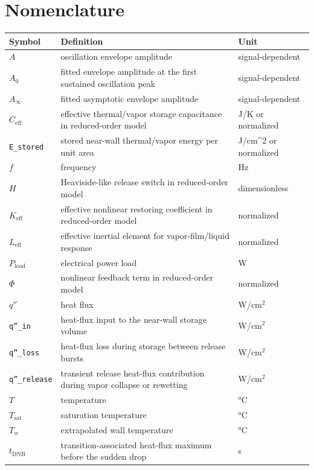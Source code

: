 \documentclass[final,1p,times]{elsarticle}
\begin{document}
\section*{Nomenclature}
\begin{center}
\small
\begin{tabular}{@{}p{}p{}p{}@{}}
\toprule
    Symbol & Definition & Unit \\
\midrule
    $A$ & oscillation envelope amplitude & signal-dependent \\
    $A_0$ & fitted envelope amplitude at the first sustained oscillation peak & signal-dependent \\
    $A_\infty$ & fitted asymptotic envelope amplitude & signal-dependent \\
    $C_{\mathrm{eff}}$ & effective thermal/vapor storage capacitance in reduced-order model & J/K or normalized \\
    \texttt{E\_stored} & stored near-wall thermal/vapor energy per unit area & J/cm\textasciicircum{}2 or normalized \\
    $f$ & frequency & Hz \\
    $H$ & Heaviside-like release switch in reduced-order model & dimensionless \\
    $K_{\mathrm{eff}}$ & effective nonlinear restoring coefficient in reduced-order model & normalized \\
    $L_{\mathrm{eff}}$ & effective inertial element for vapor-film/liquid response & normalized \\
    $P_{\mathrm{load}}$ & electrical power load & W \\
    $\Phi$ & nonlinear feedback term in reduced-order model & normalized \\
    $q''$ & heat flux & W/cm$^2$ \\
    \texttt{q''\_in} & heat-flux input to the near-wall storage volume & W/cm$^2$ \\
    \texttt{q''\_loss} & heat-flux loss during storage between release bursts & W/cm$^2$ \\
    \texttt{q''\_release} & transient release heat-flux contribution during vapor collapse or rewetting & W/cm$^2$ \\
    $T$ & temperature & °C \\
    $T_{\mathrm{sat}}$ & saturation temperature & °C \\
    $T_w$ & extrapolated wall temperature & °C \\
    $t_{\mathrm{DNB}}$ & transition-associated heat-flux maximum before the sudden drop & s \\

\end{tabular}
\end{center}
\end{document}
